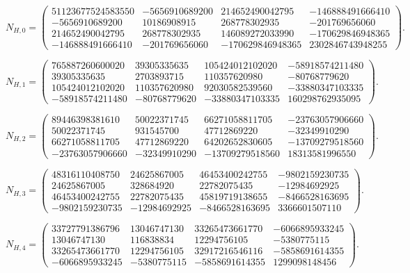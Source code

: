 \[
N_{H,0}=\begin{pmatrix}
51123677524583550 & -5656910689200 & 214652490042795 & -146888491666410\\
-5656910689200 & 10186908915 & 268778302935 & -201769656060\\
214652490042795 & 268778302935 & 146089272033990 & -170629846948365\\
-146888491666410 & -201769656060 & -170629846948365 & 2302846743948255
\end{pmatrix}.
\]

\[
N_{H,1}=\begin{pmatrix}
765887260600020 & 39305335635 & 105424012102020 & -58918574211480\\
39305335635 & 2703893715 & 110357620980 & -80768779620\\
105424012102020 & 110357620980 & 92030582539560 & -33880347103335\\
-58918574211480 & -80768779620 & -33880347103335 & 160298762935095
\end{pmatrix}.
\]

\[
N_{H,2}=\begin{pmatrix}
89446398381610 & 50022371745 & 66271058811705 & -23763057906660\\
50022371745 & 931545700 & 47712869220 & -32349910290\\
66271058811705 & 47712869220 & 64202652830605 & -13709279518560\\
-23763057906660 & -32349910290 & -13709279518560 & 18313581996550
\end{pmatrix}.
\]

\[
N_{H,3}=\begin{pmatrix}
48316110408750 & 24625867005 & 46453400242755 & -9802159230735\\
24625867005 & 328684920 & 22782075435 & -12984692925\\
46453400242755 & 22782075435 & 45819719138655 & -8466528163695\\
-9802159230735 & -12984692925 & -8466528163695 & 3366601507110
\end{pmatrix}.
\]

\[
N_{H,4}=\begin{pmatrix}
33727791386796 & 13046747130 & 33265473661770 & -6066895933245\\
13046747130 & 116838834 & 12294756105 & -5380775115\\
33265473661770 & 12294756105 & 32917216546116 & -5858691614355\\
-6066895933245 & -5380775115 & -5858691614355 & 1299098148456
\end{pmatrix}.
\]
